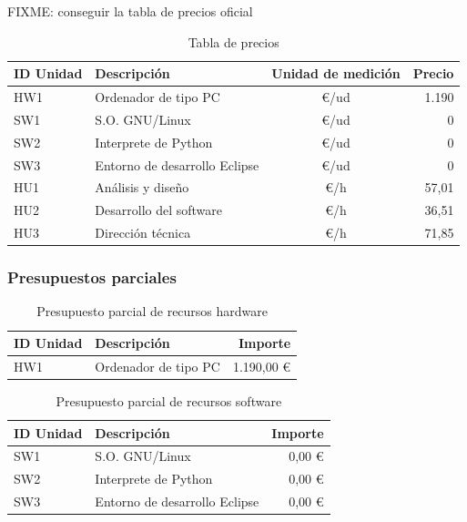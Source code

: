 FIXME: conseguir la tabla de precios oficial

\begin{table}[H]
 \begin{center}
  \begin{tabular}{|l|l|c|r|}
	\hline
	\textbf{ID Unidad} & \textbf{Descripción} & \textbf{Unidad de medición} & \textbf{Precio} \\
	\hline
	HW1 & Ordenador de tipo PC & \euro/ud & 1.190 \\
	\hline
	SW1 & S.O. GNU/Linux & \euro/ud & 0 \\
	\hline
	SW2 & Interprete de Python & \euro/ud & 0 \\
	\hline
	SW3 & Entorno de desarrollo Eclipse & \euro/ud & 0 \\
	\hline
	HU1 & Análisis y diseño & \euro/h & 57,01 \\
	\hline
	HU2 & Desarrollo del software & \euro/h & 36,51 \\
	\hline
	HU3 & Dirección técnica & \euro/h & 71,85 \\
	\hline
  \end{tabular}
  \caption{Tabla de precios}
 \end{center}
\end{table}

\subsubsection{Presupuestos parciales}

\begin{table}[H]
 \begin{center}
  \begin{tabular}{|l|l|r|}
	\hline
	\textbf{ID Unidad} & \textbf{Descripción} & \textbf{Importe} \\
	\hline
	HW1 & Ordenador de tipo PC & 1.190,00 \euro \\
	\hline
  \end{tabular}
  \caption{Presupuesto parcial de recursos hardware}
 \end{center}
\end{table}

\begin{table}[H]
 \begin{center}
  \begin{tabular}{|l|l|r|}
	\hline
	\textbf{ID Unidad} & \textbf{Descripción} & \textbf{Importe} \\
	\hline
	SW1 & S.O. GNU/Linux & 0,00 \euro \\
	\hline
	SW2 & Interprete de Python & 0,00 \euro \\
	\hline
	SW3 & Entorno de desarrollo Eclipse & 0,00 \euro \\
	\hline
  \end{tabular}
  \caption{Presupuesto parcial de recursos software}
 \end{center}
\end{table}

